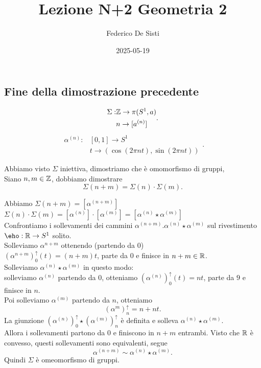 \documentclass[12px]{article}
\title{Lezione N+2 Geometria 2}
\date{2025-05-19}
\author{Federico De Sisti}
\begin{document}
	\maketitle
	\newpage
	\subsection{Fine della dimostrazione precedente}
	\[
	\begin{aligned}
		\Sigma : &\mathbb{Z} \rightarrow \pi(S^1, a)\\
			 & n \rightarrow [a^{(n)}]
	\end{aligned}
	.\] 
	\[
	\begin{aligned}
		\alpha^{(n)}:&[0,1] \rightarrow S^1\\
			     & t \rightarrow (\cos(2\pi nt), \sin(2\pi nt))
	\end{aligned}
	.\] 
	\begin{dimo}
		Abbiamo visto $\Sigma$ iniettiva, dimostriamo che è omomorfismo di gruppi,\\
		Siano  $n,m\in \mathbb{Z}$, dobbiamo dimostrare
		\[
		\Sigma(n+m) = \Sigma(n)\cdot \Sigma(m)
		.\] 
	\end{dimo}
	Abbiamo $\Sigma(n+m) = [\alpha^{(n+m)}]$\\
	$\Sigma (n)\cdot\Sigma(m) = [\alpha^{(n)}]\cdot[\alpha^{(m)}] = [\alpha^{(n)}\star\alpha^{(m)}]$\\
	Confrontiamo i sollevamenti dei cammini $\alpha^{(n+m)}. \alpha^{(n)}\star\alpha^{(m)}$ sul rivestimento  $\eho: \R \rightarrow S^1$ solito.\\
	Solleviamo $\alpha^{n+m}$ ottenendo (partendo da 0)\\
	$(\alpha^{n+m})^\uparrow_0(t) = (n+m)t$, parte da $0$ e finisce in $n+m\in\mathbb{R}$.\\
	Solleviamo $\alpha^{(n)}\star\alpha^{(m)}$ in questo modo:\\
	solleviamo  $\alpha^{(n)}$ partendo da 0, otteniamo  $(\alpha^{(n)})^\uparrow_0(t) = nt$, parte da $9$ e finisce in $n$.\\
	Poi solleviamo $\alpha^{(m)}$ partendo da  $n$, otteniamo
	\[
		(\alpha^{m})^\uparrow_n = n + nt
	.\] 
	La giunzione $(\alpha^{(n)})^\uparrow_0\star(\alpha^{(m)})^\uparrow_n$ è definita e solleva $\alpha^{(n)}\star\alpha^{(m)}$.\\
	Allora i sollevamenti partono da  $0$ e finiscono in  $n + m$ entrambi. Visto che  $\mathbb{R}$ è convesso, questi sollevamenti sono equivalenti, segue 
	 \[
		 \alpha^{(n+m)} \sim \alpha^{(n)}\star\alpha^{(m)}
	.\] 
	Quindi $\Sigma$ è omeomorfismo di gruppi.\\
\end{document}
